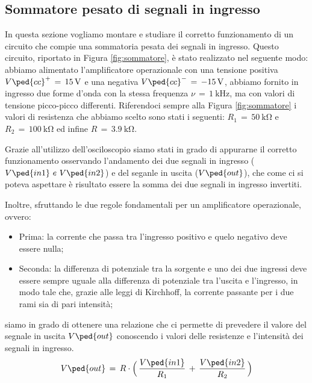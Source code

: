 \subsection*{Sommatore pesato di segnali in ingresso}

In questa sezione vogliamo montare e studiare il corretto funzionamento di un circuito che compie una sommatoria pesata dei segnali in ingresso. Questo circuito, riportato in Figura \ref{fig:sommatore}, è stato realizzato nel seguente modo: abbiamo alimentato l'amplificatore operazionale con una tensione positiva $V\ped{cc}^+\,=\,\SI{+15}{\volt}$ e una negativa $V\ped{cc}^-\,=\,\SI{-15}{\volt}$, abbiamo fornito in ingresso due forme d'onda con la stessa frequenza $\nu\,=\,\SI{1}{\kilo\hertz}$, ma con valori di tensione picco-picco differenti. Riferendoci sempre alla Figura \ref{fig:sommatore} i valori di resistenza che abbiamo scelto sono stati i seguenti: $R_1\,=\,\SI{50}{\kilo\ohm}$ e $R_2\,=\,\SI{100}{\kilo\ohm}$ ed infine $R\,=\,\SI{3.9}{\kilo\ohm}$.

Grazie all'utilizzo dell'osciloscopio siamo stati in grado di appurarne il corretto funzionamento osservando l'andamento dei due segnali in ingresso ($V\ped{in1}\,\,e\,\,V\ped{in2} $) e del seganle in uscita ($V\ped{out}$), che come ci si poteva aspettare è risultato essere la somma dei due segnali in ingresso invertiti.

Inoltre, sfruttando le due regole fondamentali per un amplificatore operazionale, ovvero:
\begin{itemize}
	\item{Prima: la corrente che passa tra l'ingresso positivo e quelo negativo deve essere nulla;}
	\item{Seconda: la differenza di potenziale tra la sorgente e uno dei due ingressi deve essere sempre uguale alla differenza di potenziale tra l'uscita e l'ingresso, in modo tale che, grazie alle leggi di Kirchhoff, la corrente passante per i due rami sia di pari intensità;}
\end{itemize}
siamo in grado di ottenere una relazione che ci permette di prevedere il valore del segnale in uscita $V\ped{out}$ conoscendo i valori delle resistenze e l'intensità dei segnali in ingresso.
\begin{equation}
	V\ped{out}\,=\,R\cdot \Bigl(\,\frac{V\ped{in1}}{R_1}\,+\,\frac{V\ped{in2}}{R_2}\,\Bigr)
\end{equation}